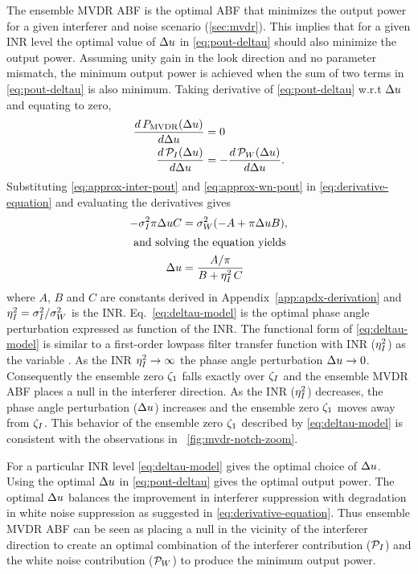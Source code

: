 The ensemble MVDR ABF is the optimal ABF that minimizes the output
power for a given interferer and noise scenario
(\sect{}\ref{sec:mvdr}). This implies that for a given INR level the
optimal value of $\Delta u$ in \eqref{eq:pout-deltau} should also
minimize the output power. Assuming unity gain in the look direction
and no parameter mismatch, the minimum output power is achieved when
the sum of two terms in \eqref{eq:pout-deltau} is also minimum. Taking
derivative of \eqref{eq:pout-deltau} w.r.t $\Delta u$ and equating to
zero,
\begin{align}
  \label{eq:derivative-equation}
  \frac{d\,P_{\rm MVDR}(\Delta u)}{d\Delta u} &= 0 \nonumber \\
 \frac{d\,\mathcal{P}_I(\Delta u)}{d\Delta u} &= -\frac{d\,\mathcal{P}_W(\Delta u)}{d\Delta u}.
\end{align}
Substituting \eqref{eq:approx-inter-pout} and \eqref{eq:approx-wn-pout} in \eqref{eq:derivative-equation} and evaluating the derivatives gives
\begin{align}
\label{eq:deltau-model}
-\sigma_I^2 \pi\Delta u C &=  \sigma^2_W (-A + \pi\Delta u B),
\nonumber \\
\intertext{ and solving the equation yields}
\Delta u &= \frac{A/\pi}{B + \eta^2_I \, C}
\end{align}
where $A$, $B$ and $C$ are constants derived in
Appendix~\ref{app:apdx-derivation} and $\eta^2_I = \sigma_I^2/\sigma^2_W$
is the INR. Eq.~\eqref{eq:deltau-model} is the optimal phase angle
perturbation expressed as function of the INR. The functional form of
\eqref{eq:deltau-model} is similar to a first-order lowpass filter
transfer function with INR ($\eta^2_I$) as the variable
\cite{Oppenheim1989}. As the INR $\eta^2_I\rightarrow \infty$ the phase
angle perturbation $\Delta u \rightarrow 0$. Consequently the ensemble
zero $\zeta_1$ falls exactly over $\zeta_I$ and the ensemble MVDR ABF
places a null in the interferer direction. As the INR ($\eta^2_I$)
decreases, the phase angle perturbation ($\Delta u$) increases and the
ensemble zero $\zeta_1$ moves away from $\zeta_I$. This behavior of
the ensemble zero $\zeta_1$ described by \eqref{eq:deltau-model} is
consistent with the observations in
\figurename{}~\ref{fig:mvdr-notch-zoom}.

For a particular INR level \eqref{eq:deltau-model} gives the optimal
choice of $\Delta u$. Using the optimal $\Delta u$ in
\eqref{eq:pout-deltau} gives the optimal output power. The optimal
$\Delta u$ balances the improvement in interferer suppression with
degradation in white noise suppression as suggested in
\eqref{eq:derivative-equation}. Thus ensemble MVDR ABF can be seen as
placing a null in the vicinity of the interferer direction to create
an optimal combination of the interferer contribution ($\mathcal{P}_I$)
and the white noise contribution ($\mathcal{P}_W$) to produce the minimum
output power.

